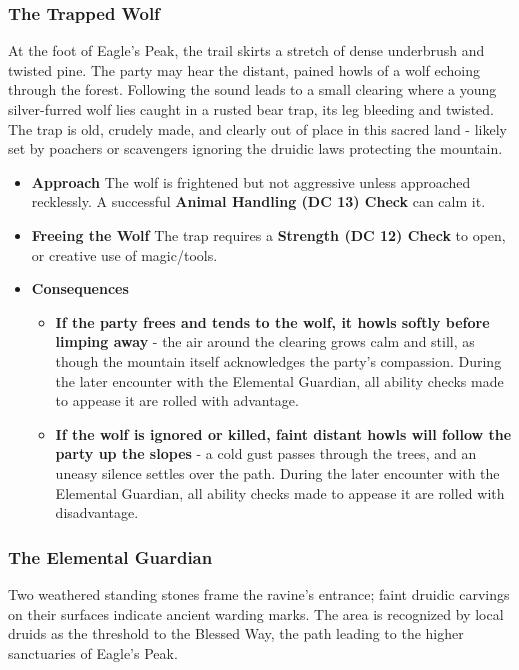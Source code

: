 \subsubsection*{The Trapped Wolf}
{\entryfont At the foot of Eagle's Peak, the trail skirts a stretch of dense underbrush and twisted pine. The party may hear the distant, pained howls of a wolf echoing through the forest. Following the sound leads to a small clearing where a young silver-furred wolf lies caught in a rusted bear trap, its leg bleeding and twisted. The trap is old, crudely made, and clearly out of place in this sacred land - likely set by poachers or scavengers ignoring the druidic laws protecting the mountain.
\begin{itemize}
	\item \textbf{Approach} The wolf is frightened but not aggressive unless approached recklessly. A successful \textbf{Animal Handling (DC 13) Check} can calm it.
	\item \textbf{Freeing the Wolf} The trap requires a \textbf{Strength (DC 12) Check} to open, or creative use of magic/tools.
	\item \textbf{Consequences}
	\begin{itemize}
		\item \textbf{If the party frees and tends to the wolf, it howls softly before limping away} - the air around the clearing grows calm and still, as though the mountain itself acknowledges the party's compassion. During the later encounter with the Elemental Guardian, all ability checks made to appease it are rolled with advantage.
		\item \textbf{If the wolf is ignored or killed, faint distant howls will follow the party up the slopes} -  a cold gust passes through the trees, and an uneasy silence settles over the path. During the later encounter with the Elemental Guardian, all ability checks made to appease it are rolled with disadvantage.
	\end{itemize}
\end{itemize}
\subsubsection*{The Elemental Guardian}
{\entryfont Two weathered standing stones frame the ravine's entrance; faint druidic carvings on their surfaces indicate ancient warding marks. The area is recognized by local druids as the threshold to the Blessed Way, the path leading to the higher sanctuaries of Eagle's Peak.

}}
